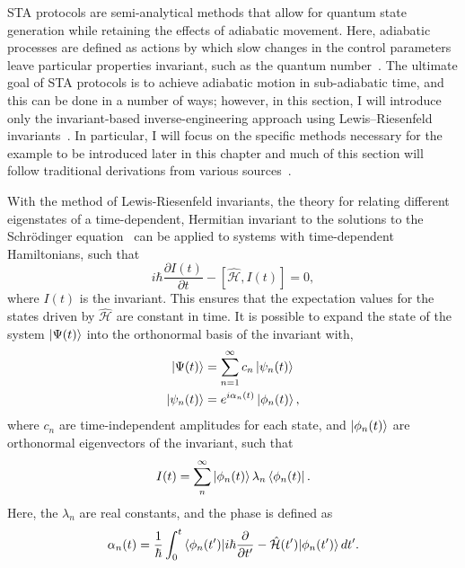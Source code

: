 STA protocols are semi-analytical methods that allow for quantum state generation while retaining the effects of adiabatic movement.
Here, adiabatic processes are defined as actions by which slow changes in the control parameters leave particular properties invariant, such as the quantum number~\cite{guery2019}.
The ultimate goal of STA protocols is to achieve adiabatic motion in sub-adiabatic time, and this can be done in a number of ways; however, in this section, I will introduce only the invariant-based inverse-engineering approach using Lewis--Riesenfeld invariants~\cite{torrontegui2013}.
In particular, I will focus on the specific methods necessary for the example to be introduced later in this chapter and much of this section will follow traditional derivations from various sources~\cite{torrontegui2013,guery2019, schloss2016}.

With the method of Lewis-Riesenfeld invariants, the theory for relating different eigenstates of a time-dependent, Hermitian invariant to the solutions to the Schr\"odinger equation~\cite{lewis1969} can be applied to systems with time-dependent Hamiltonians, such that
\begin{equation}
i\hbar \frac{\partial I(t)}{\partial t} - \left[\mathcal{\hat H},I(t)\right] = 0,
\end{equation}
\noindent where $I(t)$ is the invariant.
This ensures that the expectation values for the states driven by $\mathcal{\hat H}$ are constant in time.
It is possible to expand the state of the system $\ket{\Psi(t)}$ into the orthonormal basis of the invariant with,
\begin{align}
\ket{\Psi(t)} &=\sum_{n=1}^\infty c_n \ket{\psi_n(t)} \\
\ket{\psi_n(t)} &= e^{i\alpha_n(t)}\ket{\phi_n(t)},
\end{align}
\noindent where $c_n$ are time-independent amplitudes for each state, and $\ket{\phi_n(t)}$ are orthonormal eigenvectors of the invariant, such that
\begin{equation}
I(t) = \sum_n^\infty\ket{\phi_n(t)}\lambda_n\bra{\phi_n(t)}.
\end{equation}
\noindent Here, the $\lambda_n$ are real constants, and the phase is defined as ~\cite{lewis1969}
\begin{equation}
\alpha_n(t) = \frac{1}{\hbar}\int_0^t\braket{\phi_n(t')|i\hbar\frac{\partial}{\partial t'} - \mathcal{\hat H}(t')|\phi_n(t')}dt'.
\end{equation}

